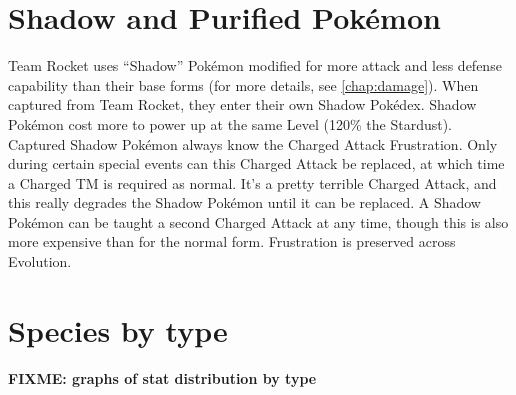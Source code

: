 \section{Shadow and Purified Pokémon}
Team Rocket uses ``Shadow'' Pokémon modified for more attack
 and less defense capability than their base forms (for more details,
 see \autoref{chap:damage}).
When captured from Team Rocket, they enter their own Shadow Pokédex.
Shadow Pokémon cost more to power up at the same Level (120\% the Stardust).
Captured Shadow Pokémon always know the Charged Attack Frustration.
Only during certain special events can this Charged Attack be replaced,
 at which time a Charged TM is required as normal.
It's a pretty terrible Charged Attack, and this really degrades the
 Shadow Pokémon until it can be replaced.
A Shadow Pokémon can be taught a second Charged Attack at any
 time, though this is also more expensive than for the normal form.
Frustration is preserved across Evolution.

\section{Species by type}
\textbf{FIXME: graphs of stat distribution by type}


